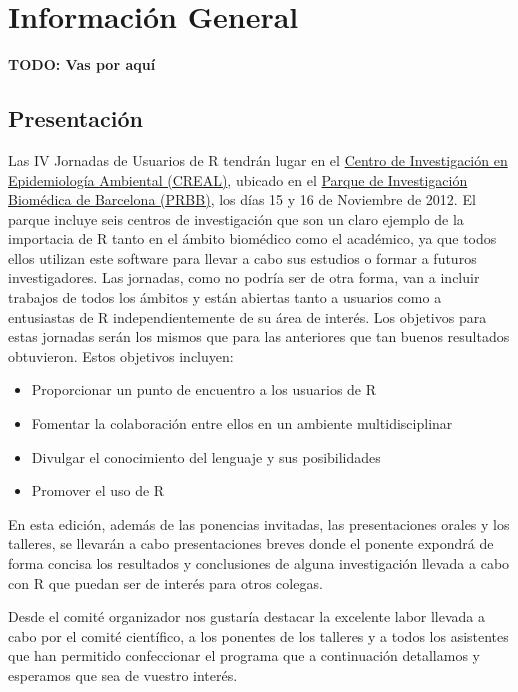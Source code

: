 \part{Información General}

\textbf{TODO: Vas por aquí}
\chapter{Presentación}

Las IV Jornadas de Usuarios de R tendrán lugar en el
\href{http://www.creal.cat/es_index.html}{Centro de Investigación en
  Epidemiología Ambiental (CREAL)}, ubicado en el
\href{http://www.prbb.org}{Parque de Investigación Biomédica de
  Barcelona (PRBB)}, los días 15 y 16 de Noviembre de 2012. El parque
incluye seis centros de investigación que son un claro ejemplo de la
importacia de R tanto en el ámbito biomédico como el académico, ya que
todos ellos utilizan este software para llevar a cabo sus estudios o
formar a futuros investigadores. Las jornadas, como no podría ser de
otra forma, van a incluir trabajos de todos los ámbitos y están
abiertas tanto a usuarios como a entusiastas de R independientemente
de su área de interés. Los objetivos para estas jornadas serán los
mismos que para las anteriores que tan buenos resultados
obtuvieron. Estos objetivos incluyen:

\begin{itemize}
\item Proporcionar un punto de encuentro a los usuarios de R 
\item Fomentar la colaboración entre ellos en un ambiente multidisciplinar 
\item Divulgar el conocimiento del lenguaje y sus posibilidades 
\item Promover el uso de R 
\end{itemize}

En esta edición, además de las ponencias invitadas, las
presentaciones orales y los talleres, se llevarán a cabo
presentaciones breves donde el ponente expondrá de forma concisa los
resultados y conclusiones de alguna investigación llevada a cabo con R
que puedan ser de interés para otros colegas.

Desde el comité organizador nos gustaría destacar la excelente labor
llevada a cabo por el comité científico, a los ponentes de los
talleres y a todos los asistentes que han permitido confeccionar el
programa que a continuación detallamos y esperamos que sea de vuestro
interés.

